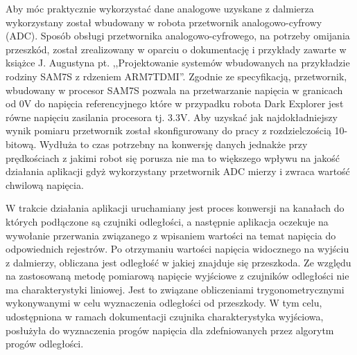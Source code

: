 Aby móc praktycznie wykorzystać dane analogowe uzyskane z dalmierza wykorzystany
został wbudowany w robota przetwornik analogowo-cyfrowy (ADC). Sposób obsługi
przetwornika analogowo-cyfrowego, na potrzeby omijania przeszkód, został
zrealizowany w oparciu o dokumentację i przykłady zawarte w książce J. Augustyna
pt. ,,Projektowanie systemów wbudowanych na przykładzie rodziny SAM7S z rdzeniem
ARM7TDMI''. Zgodnie ze specyfikacją, przetwornik, wbudowany w procesor SAM7S
pozwala na przetwarzanie napięcia w granicach od 0V do napięcia referencyjnego
które w przypadku robota Dark Explorer jest równe napięciu zasilania procesora
tj. 3.3V. Aby uzyskać jak najdokładniejszy wynik pomiaru
przetwornik został skonfigurowany do pracy z rozdzielczością 10-bitową. Wydłuża to czas potrzebny na
konwersję danych jednakże przy prędkościach z jakimi robot się porusza nie ma to
większego wpływu na jakość działania aplikacji gdyż wykorzystany przetwornik
ADC mierzy i zwraca wartość chwilową napięcia\cite{JAugustyn}.

W trakcie działania aplikacji uruchamiany jest proces konwersji na kanałach do
których podłączone są czujniki odległości, a następnie aplikacja oczekuje na
wywołanie przerwania związanego z wpisaniem wartości na temat napięcia do
odpowiednich rejestrów. Po otrzymaniu wartości napięcia widocznego na wyjściu z
dalmierzy, obliczana jest odległość w jakiej znajduje się przeszkoda. Ze względu
na zastosowaną metodę pomiarową napięcie wyjściowe z czujników odległości nie ma
charakterystyki liniowej. Jest to związane obliczeniami trygonometrycznymi
wykonywanymi w celu wyznaczenia odległości od przeszkody. 
W tym celu,
udostępniona w ramach dokumentacji czujnika\cite{GP2D12DataSheet} charakterystyka
wyjściowa, posłużyła do wyznaczenia progów napięcia dla zdefniowanych przez
algorytm progów odległości.

